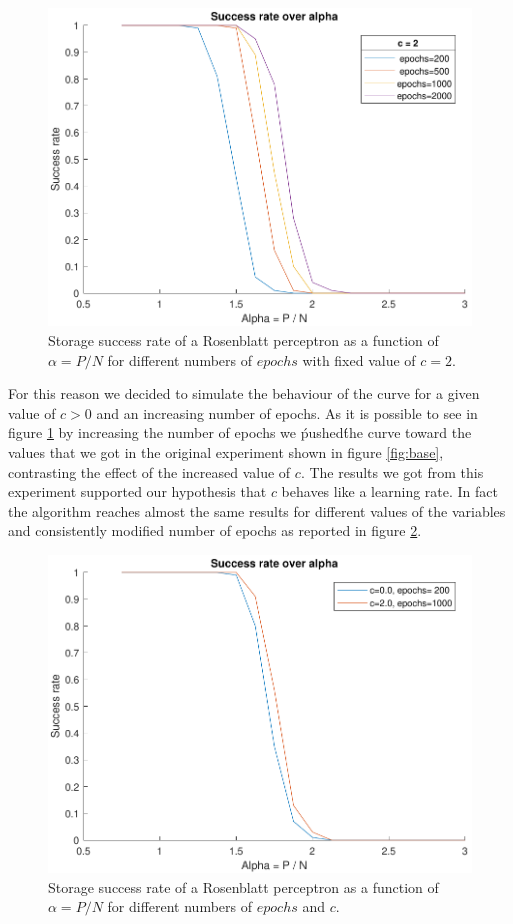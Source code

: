 \begin{figure}[t]
	\centering
	\includegraphics[width=\columnwidth]{figures/bonus_2_epoch}
    \caption{Storage success rate of a Rosenblatt perceptron as a function of $\alpha = P / N$ for different numbers of $epochs$ with fixed value of $c=2$.}
	\label{fig:fixed_c_multiple_epoch}
\end{figure}
For this reason we decided to simulate the behaviour of the curve for a given value of $c > 0$ and an increasing number of epochs. As it is possible to see
in figure \ref{fig:fixed_c_multiple_epoch} by increasing the number of epochs we \'pushed\' the curve toward the values that we got in the original experiment shown
in figure \ref{fig:base}, contrasting the effect of the increased value of $c$. The results we got from this experiment supported our hypothesis that $c$ behaves like
a learning rate. In fact the algorithm reaches almost the same results for different values of the variables and consistently modified number of epochs as reported in
figure \ref{fig:multiple_c_multiple_epoch}.

\begin{figure}[t]
	\centering
	\includegraphics[width=\columnwidth]{figures/bonus_2_c_epoch}
    \caption{Storage success rate of a Rosenblatt perceptron as a function of $\alpha = P / N$ for different numbers of $epochs$ and $c$.}
	\label{fig:multiple_c_multiple_epoch}
\end{figure}

